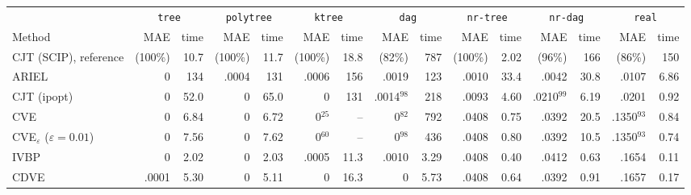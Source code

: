 \begin{tabular}{lrrrrrrrrrrrrrr}
\toprule
 & \multicolumn{2}{c}{\texttt{tree}} & \multicolumn{2}{c}{\texttt{polytree}} & \multicolumn{2}{c}{\texttt{ktree}} & \multicolumn{2}{c}{\texttt{dag}} & \multicolumn{2}{c}{\texttt{nr-tree}} & \multicolumn{2}{c}{\texttt{nr-dag}} & \multicolumn{2}{c}{\texttt{real}} \\
\cmidrule(lr){2-3}\cmidrule(lr){4-5}\cmidrule(lr){6-7}\cmidrule(lr){8-9}\cmidrule(lr){10-11}\cmidrule(lr){12-13}\cmidrule(lr){14-15}
Method & MAE & time & MAE & time & MAE & time & MAE & time & MAE & time & MAE & time & MAE & time \\
\midrule
CJT (SCIP), reference & (100\%) & 10.7 & (100\%) & 11.7 & (100\%) & 18.8 & (82\%) & 787 & (100\%) & 2.02 & (96\%) & 166 & (86\%) & 150 \\
ARIEL & 0 & 134 & .0004 & 131 & .0006 & 156 & .0019 & 123 & .0010 & 33.4 & .0042 & 30.8 & .0107 & 6.86 \\
CJT (ipopt) & 0 & 52.0 & 0 & 65.0 & 0 & 131 & .0014$^{98}$ & 218 & .0093 & 4.60 & .0210$^{99}$ & 6.19 & .0201 & 0.92 \\
CVE & 0 & 6.84 & 0 & 6.72 & 0$^{25}$ & -- & 0$^{82}$ & 792 & .0408 & 0.75 & .0392 & 20.5 & .1350$^{93}$ & 0.84 \\
CVE$_\varepsilon$ ($\varepsilon{=}0.01$) & 0 & 7.56 & 0 & 7.62 & 0$^{60}$ & -- & 0$^{98}$ & 436 & .0408 & 0.80 & .0392 & 10.5 & .1350$^{93}$ & 0.74 \\
IVBP & 0 & 2.02 & 0 & 2.03 & .0005 & 11.3 & .0010 & 3.29 & .0408 & 0.40 & .0412 & 0.63 & .1654 & 0.11 \\
CDVE & .0001 & 5.30 & 0 & 5.11 & 0 & 16.3 & 0 & 5.73 & .0408 & 0.64 & .0392 & 0.91 & .1657 & 0.17 \\
\bottomrule
\end{tabular}

